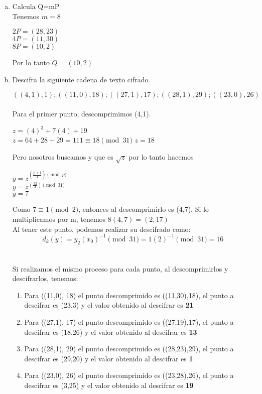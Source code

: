 \documentclass[12pt, letterpaper]{article}
\begin{document}
\begin{enumerate}[a)]
\item Calcula Q=mP
\\
Tenemos $m=8$
\begin{center}
$2P=(28,23)$
\\
$4P=(11,30)$
\\
$8P=(10,2)$

\end{center}
Por lo tanto $Q=(10,2)$

\item Descifra la siguiente cadena de texto cifrado.

\[
((4, 1), 1); ((11, 0), 18); ((27, 1), 17); ((28, 1), 29); ((23, 0), 26)
\]
\\
Para el primer punto, descomprimimos (4,1).
\begin{center}
$z=(4)^3+7(4)+19$
\\
$z=64+28+29= 111 \equiv 18 \pmod{31} $
$z=18$
\end{center}

Pero nosotros buscamos y que es $\sqrt{z}$ por lo tanto hacemos
\\
\begin{center}
$y=z^{\left(  \frac{p+1}{4} \right) \pmod{p}}$
\\
$y=z^{\left(  \frac{32}{4}\right) \pmod{31}}$
\\
$y=7$
\end{center}

Como $7 \equiv 1 \pmod{2}$, entonces al descomprimirlo es (4,7). Si lo multiplicamos por m, tenemos $8(4,7)=(2,17)$ 
\\
Al tener este punto, podemos realizar su descifrado como:
\[
d_k(y)= y_2(x_0)^{-1} \pmod{31} = 1(2)^{-1} \pmod{31}= 16
\]
\\
\\
Si realizamos el mismo proceso para cada punto, al descomprimirlos y descifrarlos, tenemos:
\begin{enumerate}[*]
\item Para ((11,0), 18) el punto descomprimido es ((11,30),18), el punto a descifrar es (23,3) y el valor obtenido al descifrar es \textbf{21}
\item Para ((27,1), 17) el punto descomprimido es ((27,19),17), el punto a descifrar es (18,26) y el valor obtenido al descifrar es \textbf{13}
\item Para ((28,1), 29) el punto descomprimido es ((28,23),29), el punto a descifrar es (29,20) y el valor obtenido al descifrar es \textbf{1}
\item Para ((23,0), 26) el punto descomprimido es ((23,28),26), el punto a descifrar es (3,25) y el valor obtenido al descifrar es \textbf{19}
\end{enumerate}


\end{enumerate}
\end{document}
